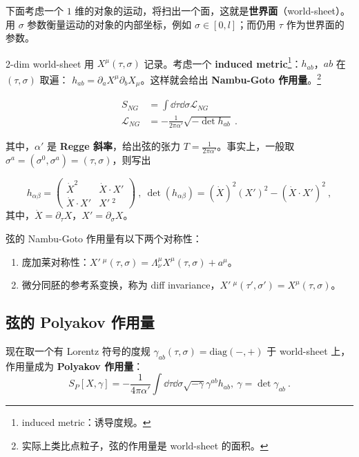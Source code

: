 下面考虑一个 $1$ 维的对象的运动，将扫出一个面，这就是\textbf{世界面}（world-sheet）。用 $\sigma$ 参数衡量运动的对象的内部坐标，例如 $\sigma \in [0, l]$；而仍用 $\tau$ 作为世界面的参数。

2-dim world-sheet 用 $X^\mu(\tau, \sigma)$ 记录。考虑一个 \textbf{induced metric}\footnote{induced metric：诱导度规。}：$h_{ab}$，$ab$ 在 $(\tau, \sigma)$ 取遍： $h_{ab} = \partial_a X^\mu \partial_b X_\mu$。这样就会给出 \textbf{Nambu-Goto 作用量}。\footnote{实际上类比点粒子，弦的作用量是 world-sheet 的面积。}
\begin{theorem}{}
	\begin{equation}
		\begin{aligned}
			S_{NG} &= \int \dd \tau \dd \sigma \mathcal L_{NG} \\
			\mathcal L_{NG} &= -\frac{1}{2 \pi \alpha'} \sqrt{-\det h_{ab}} ~.
		\end{aligned}
	\end{equation}
\end{theorem}
其中，$\alpha '$ 是 \textbf{Regge 斜率}，给出弦的张力 $T = \frac{1}{2\pi \alpha'}$。事实上，一般取 $\sigma^a = (\sigma^0, \sigma^a) = (\tau, \sigma)$，则写出 
\begin{lemma}{}
	\begin{equation}
		h_{\alpha \beta} = \left(\begin{matrix}
			\dot X^2 & \dot X \cdot X' \\
			\dot X \cdot X' & X'~^2 
		\end{matrix}\right) ~, ~ \det(h_{\alpha \beta}) = (\dot X)^2 (X')^2 - (\dot X \cdot X')^2 ~,
	\end{equation}
	其中，$\dot X = \partial_\tau X$，$X' = \partial_\sigma X$。
\end{lemma}

\begin{theorem}{}
	弦的 Nambu-Goto 作用量有以下两个对称性：
	\begin{enumerate}
		\item 庞加莱对称性：$X'~^\mu(\tau, \sigma) = \Lambda_\nu^\mu X^\mu(\tau, \sigma) + a^\mu$。
		\item 微分同胚的参考系变换，称为 diff invariance，$X'~^\mu(\tau', \sigma') = X^\mu(\tau, \sigma)$。
	\end{enumerate}
\end{theorem}

\subsection{弦的 Polyakov 作用量}
\begin{theorem}{}
	现在取一个有 Lorentz 符号的度规 $\gamma_{ab}(\tau, \sigma) = \text{diag}(-, +)$ 于 world-sheet 上，作用量成为 \textbf{Polyakov 作用量}：
	\begin{equation}
		S_P [X, \gamma] = -\frac{1}{4 \pi \alpha'} \int \dd \tau \dd \sigma \sqrt{-\gamma} \gamma^{ab} h_{ab}, ~ \gamma = \det \gamma_{ab} ~.
	\end{equation}
\end{theorem}

